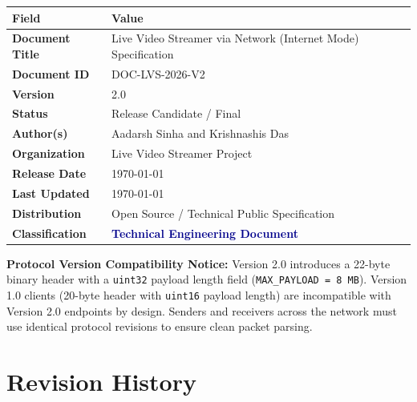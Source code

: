 \documentclass[11pt,a4paper]{article}
\begin{document}
\begin{table}[H]
    \renewcommand{\arraystretch}{1.5}
    \begin{tabularx}{\textwidth}{@{}lX@{}}
        \toprule
        \textbf{Field} & \textbf{Value} \\
        \midrule
        \textbf{Document Title} & Live Video Streamer via Network (Internet Mode) Specification \\
        \textbf{Document ID}    & DOC-LVS-2026-V2 \\
        \textbf{Version}        & 2.0 \\
        \textbf{Status}         & Release Candidate / Final \\
        \midrule
        \textbf{Author(s)}      & Aadarsh Sinha and Krishnashis Das \\
        \textbf{Organization}   & Live Video Streamer Project \\
        \midrule
        \textbf{Release Date}   & \today \\
        \textbf{Last Updated}   & \today \\
        \midrule
        \textbf{Distribution}   & Open Source / Technical Public Specification \\
        \textbf{Classification} & \textcolor{darkblue}{\textbf{Technical Engineering Document}} \\
        \bottomrule
    \end{tabularx}
\end{table}

\vspace{1cm}

\begin{alertbox}
    \textbf{Protocol Version Compatibility Notice:} Version 2.0 introduces a 22-byte binary header with a \texttt{uint32} payload length field (\texttt{MAX\_PAYLOAD = 8 MB}). Version 1.0 clients (20-byte header with \texttt{uint16} payload length) are incompatible with Version 2.0 endpoints by design. Senders and receivers across the network must use identical protocol revisions to ensure clean packet parsing.
\end{alertbox}

\newpage
\section*{Revision History}
\end{document}
